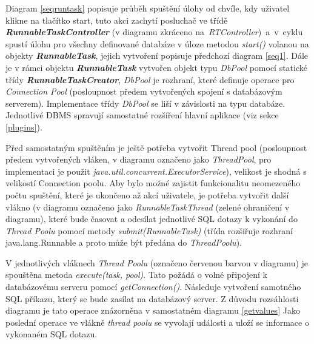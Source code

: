 \documentclass[czech,bachelor,public,dept460,male,cpdeclaration,twoside]{diploma}
\begin{document}
Diagram \ref{seqruntask} popisuje průběh spuštění úlohy od chvíle, kdy uživatel klikne na tlačítko start, tuto akci zachytí posluchač ve třídě \textbf{\emph{RunnableTaskController}} (v diagramu zkráceno na~\textit{RTController})~a~v~cyklu spustí úlohu pro všechny definované databáze v úloze metodou \textit{start()} volanou na objekty \textbf{\emph{RunnableTask}}, jejich vytvoření popisuje předchozí diagram \ref{seq1}. Dále je v rámci objektu \textbf{\emph{RunnableTask}} vytvořen objekt typu \textit{DbPool} pomocí statické třídy \textbf{\emph{RunnableTaskCreator}}, \textit{DbPool} je rozhraní, které definuje operace pro \textit{Connection Pool} (posloupnost předem vytvořených spojení s databázovým serverem). Implementace třídy \textit{DbPool} se liší v závislosti na typu databáze. Jednotlivé DBMS spravují samostatné rozšíření hlavní aplikace (viz sekce \ref{plugins}).


Před samostatným spuštěním je ještě potřeba vytvořit Thread pool (posloupnost předem vytvořených vláken, v diagramu označeno jako \textit{ThreadPool}, pro implementaci je použit \newline \textit{java.util.concurrent.ExecutorService}), velikost je shodná s velikostí Connection poolu. Aby bylo možné zajistit funkcionalitu neomezeného počtu spuštění, které je ukončeno až akcí uživatele, je potřeba vytvořit další vlákno (v diagramu označeno jako \textit{RunnableTaskThread} (zelené ohraničení v diagramu), které bude časovat a odesílat jednotlivé SQL dotazy k vykonání do \textit{Thread Poolu} pomocí metody \textit{submit(RunnableTask)} (třída rozšiřuje rozhraní java.lang.Runnable a proto může být předána do \textit{ThreadPoolu}).

V jednotlivých vláknech \textit{Thread Poolu} (označeno červenou barvou v diagramu) je spouštěna metoda \textit{execute(task, pool)}. Tato požádá o volné připojení k databázovému serveru pomocí \textit{getConnection()}. Následuje vytvoření samotného SQL příkazu, který se bude zasílat na databázový server. Z důvodu rozsáhlosti diagramu je tato operace znázorněna v samostatném diagramu \ref{getvalues} Jako poslední operace ve vlákně \textit{thread poolu} se vyvolají události a uloží se informace o vykonaném SQL dotazu.
\end{document}
